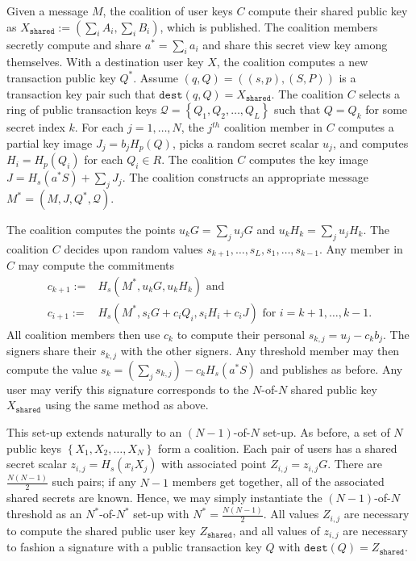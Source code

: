 \documentclass{mrl}
\theoremstyle{definition}
\begin{document}
Given a message $M$, the coalition of user keys $C$ compute their shared public key as $X_{\texttt{shared}} := (\sum_i A_i, \sum_i B_i)$, which is published. The coalition members secretly compute and share $a^*=\sum_i a_i$ and share this secret view key among themselves. With a destination user key $X$, the coalition computes a new transaction public key $Q^*$. Assume $(q,Q)=((s,p),(S,P))$ is a transaction key pair such that $\texttt{dest}(q,Q) = X_{\texttt{shared}}$. The coalition $C$ selects a ring of public transaction keys $\mathcal{Q} = \left\{Q_1, Q_2, \ldots, Q_L\right\}$ such that $Q = Q_{k}$ for some secret index $k$.  For each $j=1, \ldots, N$, the $j^{th}$ coalition member in $C$ computes a partial key image $J_j = b_j H_p(Q)$, picks a random secret scalar $u_j$, and computes $H_i = H_{p}(Q_i)$ for each $Q_i \in R$. The coalition $C$ computes the key image $J = H_s(a^* S) + \sum_j J_j$. The coalition constructs an appropriate message $M^*=(M,J,Q^*,\mathcal{Q})$.

The coalition computes the points $u_{k} G = \sum_j u_{j} G$ and $u_{k} H_{k}= \sum_j u_{j} H_{k}$. The coalition $C$ decides upon random values $s_{k+1}, \ldots, s_{L}, s_1, \ldots, s_{k-1}$. Any member in $C$ may compute the commitments 
\begin{align*}
c_{k+1} :=& H_{s}(M^*,  u_k G, u_k H_k) \text{ and}\\
c_{i+1} :=& H_{s}(M^*,  s_{i} G + c_i Q_i, s_{i} H_i + c_i J)\text{ for }i=k+1, \ldots, k-1.
\end{align*}
All coalition members then use $c_k$ to compute their personal $s_{k,j} = u_j - c_{k} b_j$. The signers share their $s_{k,j}$ with the other signers. Any threshold member may then compute the value $s_{k} = (\sum_j s_{k,j}) - c_k H_s(a^* S)$ and publishes as before. Any user may verify this signature corresponds to the $N$-of-$N$ shared public key $X_{\texttt{shared}}$ using the same method as above.

This set-up extends naturally to an $(N-1)$-of-$N$ set-up. As before, a set of $N$ public keys $\left\{X_{1}, X_{2}, \ldots, X_{N}\right\}$ form a coalition. Each pair of users has a shared secret scalar $z_{i,j} = H_{s}(x_i X_j)$ with associated point $Z_{i,j} = z_{i,j}G$. There are $\frac{N(N-1)}{2}$ such pairs; if any $N-1$ members get together, all of the associated shared secrets are known. Hence, we may simply instantiate the $(N-1)$-of-$N$ threshold as an $N^*$-of-$N^*$ set-up with $N^* = \frac{N(N-1)}{2}$. All values $Z_{i,j}$ are necessary to compute the shared public user key $Z_{\texttt{shared}}$, and all values of $z_{i,j}$ are necessary to fashion a signature with a public transaction key $Q$ with $\texttt{dest}(Q)=Z_{\texttt{shared}}$.
\end{document}
